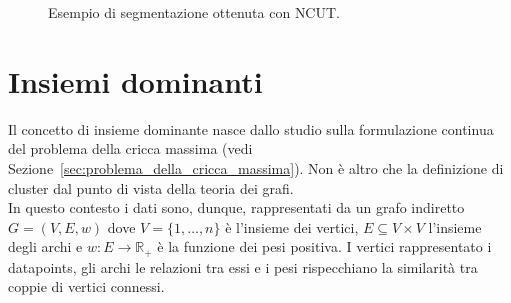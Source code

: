\begin{figure}[h!]
    \centering
	\caption{Esempio di segmentazione ottenuta con NCUT.}
\end{figure}



\newpage


\section{Insiemi dominanti} %

Il concetto di insieme dominante nasce dallo studio sulla formulazione continua del 
problema della cricca massima (vedi Sezione~\ref{sec:problema_della_cricca_massima}). Non è altro che la definizione di cluster dal punto di vista della teoria dei grafi.\\

In questo contesto i dati sono, dunque, rappresentati da un grafo indiretto $G = (V, E , w)$ dove $V = \{ 1, \dots, n \}$ è l'insieme dei vertici, $E\subseteq V \times V$ l'insieme degli archi e $w : E \rightarrow \mathbb{R}_+$ è la funzione dei pesi positiva. I vertici rappresentato i datapoints, gli archi le relazioni tra essi e i pesi rispecchiano la similarità tra coppie di vertici connessi.\\

